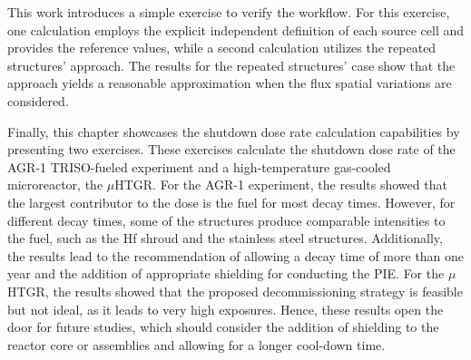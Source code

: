 This work introduces a simple exercise to verify the workflow.
For this exercise, one calculation employs the explicit independent definition of each source cell and provides the reference values, while a second calculation utilizes the repeated structures' approach.
The results for the repeated structures' case show that the approach yields a reasonable approximation when the flux spatial variations are considered.

Finally, this chapter showcases the shutdown dose rate calculation capabilities by presenting two exercises.
These exercises calculate the shutdown dose rate of the AGR-1 TRISO-fueled experiment and a high-temperature gas-cooled microreactor, the $\mu$HTGR.
For the AGR-1 experiment, the results showed that the largest contributor to the dose is the fuel for most decay times.
However, for different decay times, some of the structures produce comparable intensities to the fuel, such as the Hf shroud and the stainless steel structures.
Additionally, the results lead to the recommendation of allowing a decay time of more than one year and the addition of appropriate shielding for conducting the PIE.
For the $\mu$HTGR, the results showed that the proposed decommissioning strategy is feasible but not ideal, as it leads to very high exposures.
Hence, these results open the door for future studies, which should consider the addition of shielding to the reactor core or assemblies and allowing for a longer cool-down time.

